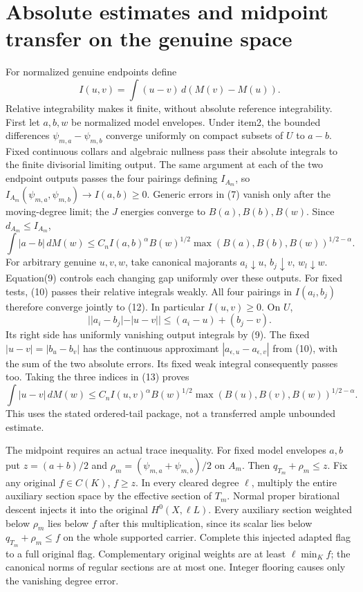 \documentclass[11pt]{article}
\begin{document}
\section{Absolute estimates and midpoint transfer on the genuine space}
For normalized genuine endpoints define
\[
 I(u,v)=\int(u-v)\,d(M(v)-M(u)).                           \tag{12}
\]
Relative integrability makes it finite, without absolute reference
integrability. First let $a,b,w$ be normalized model envelopes.
Under item2, the bounded differences $\psi_{m,a}-\psi_{m,b}$ converge
uniformly on compact subsets of $U$ to $a-b$. Fixed continuous collars
and algebraic nullness pass their absolute integrals to the finite
divisorial limiting output. The same argument at each of the two
endpoint outputs passes the four pairings defining $I_{A_m}$, so
$I_{A_m}(\psi_{m,a},\psi_{m,b})\to I(a,b)\geq0$.
Generic errors in (7) vanish only after the moving-degree limit;
the $J$ energies converge to $B(a),B(b),B(w)$. Since $d_{A_m}\leq I_{A_m}$,
\[
 \int|a-b|\,dM(w)\leq C_n I(a,b)^\alpha B(w)^{1/2}
                  \max(B(a),B(b),B(w))^{1/2-\alpha}.       \tag{13}
\]
For arbitrary genuine $u,v,w$, take canonical majorants
$a_i\downarrow u$, $b_j\downarrow v$, $w_l\downarrow w$.
Equation(9) controls each changing gap uniformly over these outputs.
For fixed tests, (10) passes their relative integrals weakly.
All four pairings in $I(a_i,b_j)$ therefore converge jointly to (12).
In particular $I(u,v)\geq0$. On $U$,
\[
 ||a_i-b_j|-|u-v||\leq(a_i-u)+(b_j-v).
\]
Its right side has uniformly vanishing output integrals by (9).
The fixed $|u-v|=|b_u-b_v|$ has the continuous approximant
$|a_{\epsilon,u}-a_{\epsilon,v}|$ from (10), with the sum of the two
absolute errors. Its fixed weak integral consequently passes too.
Taking the three indices in (13) proves
\[
 \int|u-v|\,dM(w)\leq C_n I(u,v)^\alpha B(w)^{1/2}
                  \max(B(u),B(v),B(w))^{1/2-\alpha}.       \tag{14}
\]
This uses the stated ordered-tail package, not a transferred ample
unbounded estimate.

The midpoint requires an actual trace inequality. For fixed model
envelopes $a,b$ put $z=(a+b)/2$ and
$\rho_m=(\psi_{m,a}+\psi_{m,b})/2$ on $A_m$.
Then $q_{T_m}+\rho_m\leq z$. Fix any original $f\in C(K)$, $f\geq z$.
In every cleared degree $\ell$, multiply the entire auxiliary section
space by the effective section of $T_m$. Normal proper birational
descent injects it into the original $H^0(X,\ell L)$.
Every auxiliary section weighted below $\rho_m$ lies below $f$ after
this multiplication, since its scalar lies below
$q_{T_m}+\rho_m\leq f$ on the whole supported carrier.
Complete this injected adapted flag to a full original flag.
Complementary original weights are at least $\ell\min_Kf$; the
canonical norms of regular sections are at most one. Integer flooring
causes only the vanishing degree error.
\end{document}
